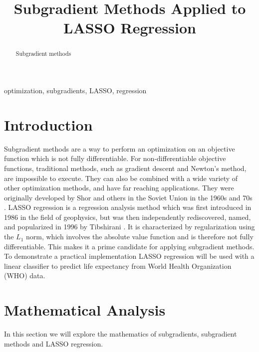 \documentclass[journal,onecolumn]{IEEEtran}
\begin{document}
\title{
Subgradient Methods Applied to LASSO Regression
}

\author{
}


\maketitle

\begin{abstract}
Subgradient methods
\end{abstract}

\begin{IEEEkeywords}
optimization, subgradients, LASSO, regression
\end{IEEEkeywords}

\section{Introduction}\label{sec:intro}
Subgradient methods are a way to perform an optimization on an objective function which is not fully differentiable. For non-differentiable objective functions, traditional methods, such as gradient descent and Newton's method, are impossible to execute. They can also be combined with a wide variety of other optimization methods, and have far reaching applications. They were originally developed by Shor and others in the Soviet Union in the 1960s and 70s \cite{boydparksubgradients} \cite{boydxiaosubgradients}. LASSO regression is a regression analysis method which was first introduced in 1986 \cite{lassooriginal} in the field of geophysics, but was then independently rediscovered, named, and popularized in 1996 by Tibshirani \cite{lassopaper}. It is characterized by regularization using the \(L_1\) norm, which involves the absolute value function and is therefore not fully differentiable. This makes it a prime candidate for applying subgradient methods. To demonstrate a practical implementation LASSO regression will be used with a linear classifier to predict life expectancy from World Health Organization (WHO) data.


\section{Mathematical Analysis}\label{sec:math}
In this section we will explore the mathematics of subgradients, subgradient methods and LASSO regression.
\end{document}
